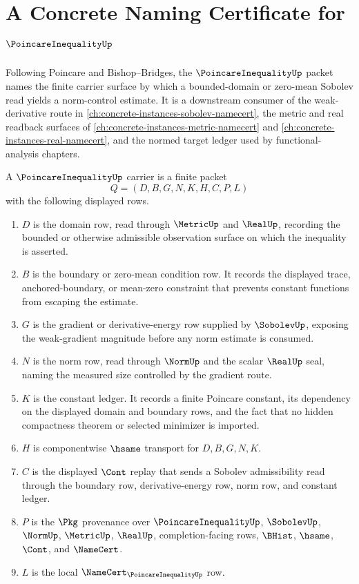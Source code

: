 \chapter{A Concrete Naming Certificate for $\PoincareInequalityUp$}
\label{ch:concrete-instances-poincare-inequality-namecert}

Following Poincare and Bishop--Bridges, the $\PoincareInequalityUp$ packet names the finite carrier surface by which a bounded-domain or zero-mean Sobolev read yields a norm-control estimate. It is a downstream consumer of the weak-derivative route in \autoref{ch:concrete-instances-sobolev-namecert}, the metric and real readback surfaces of \autoref{ch:concrete-instances-metric-namecert} and \autoref{ch:concrete-instances-real-namecert}, and the normed target ledger used by functional-analysis chapters.

\begin{definition}
\label{def:poincare-inequality-carrier}
A $\PoincareInequalityUp$ carrier is a finite packet
$$
Q=(D,B,G,N,K,H,C,P,L)
$$
with the following displayed rows.
\begin{enumerate}
\item $D$ is the domain row, read through $\MetricUp$ and $\RealUp$, recording the bounded or otherwise admissible observation surface on which the inequality is asserted.
\item $B$ is the boundary or zero-mean condition row. It records the displayed trace, anchored-boundary, or mean-zero constraint that prevents constant functions from escaping the estimate.
\item $G$ is the gradient or derivative-energy row supplied by $\SobolevUp$, exposing the weak-gradient magnitude before any norm estimate is consumed.
\item $N$ is the norm row, read through $\NormUp$ and the scalar $\RealUp$ seal, naming the measured size controlled by the gradient route.
\item $K$ is the constant ledger. It records a finite Poincare constant, its dependency on the displayed domain and boundary rows, and the fact that no hidden compactness theorem or selected minimizer is imported.
\item $H$ is componentwise $\hsame$ transport for $D,B,G,N,K$.
\item $C$ is the displayed $\Cont$ replay that sends a Sobolev admissibility read through the boundary row, derivative-energy row, norm row, and constant ledger.
\item $P$ is the $\Pkg$ provenance over $\PoincareInequalityUp$, $\SobolevUp$, $\NormUp$, $\MetricUp$, $\RealUp$, completion-facing rows, $\BHist$, $\hsame$, $\Cont$, and $\NameCert$.
\item $L$ is the local $\NameCert_{\PoincareInequalityUp}$ row.
\end{enumerate}
\end{definition}


